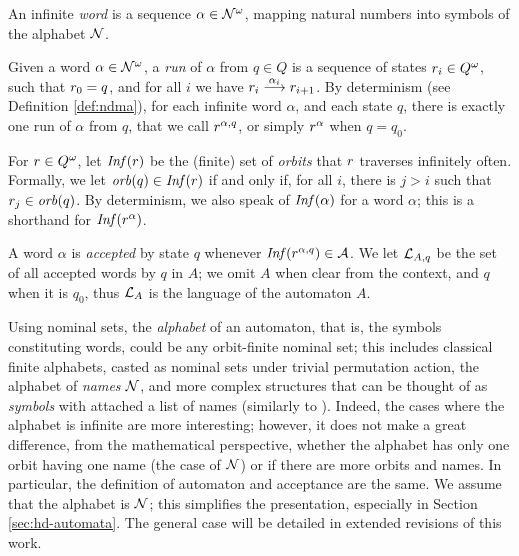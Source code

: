 \begin{definition}
 An infinite \emph{word} is a sequence $\alpha \in \mathcal{N}^\omega$, mapping natural numbers into symbols of the alphabet $\mathcal{N}$.
\end{definition}

\begin{definition}\label{def:nominal-run}
 Given a word $\alpha \in \mathcal{N}^\omega$, a \emph{run} of $\alpha$ from $q \in Q$ is a sequence of states $r_i \in Q^\omega$, such that $r_0 = q$, and for all $i$ we have $r_i \overset{\alpha_i}{\longrightarrow} r_{i+1}$. 
 By determinism (see Definition \ref{def:ndma}), for each infinite word $\alpha$, and each state $q$, there is exactly one run of $\alpha$ from $q$, that we call $r^{\alpha,q}$, or simply $r^{\alpha}$ when $q=q_0$.
\end{definition}

\begin{definition}\label{def:inf-set}
 For $r \in Q^\omega$, let $\mathit{Inf}(r)$ be the (finite) set of \emph{orbits} that $r$ traverses infinitely often. Formally, we let $\mathit{orb}(q) \in \mathit{Inf}(r)$ if and only if, for all $i$, there is $j > i$ such that $r_j \in \mathit{orb}(q)$. By determinism, we also speak of $\mathit{Inf}(\alpha)$ for a word $\alpha$; this is a shorthand for $\mathit{Inf}(r^\alpha)$.
\end{definition}

\begin{definition}
 A word $\alpha$ is \emph{accepted} by state $q$ whenever $\mathit{Inf}(r^{\alpha,q}) \in \mathcal{A}$. We let $\mathcal{L}_{A,q}$ be the set of all accepted words by $q$ in $A$; we omit $A$ when clear from the context, and $q$ when it is $q_0$, thus $\mathcal{L}_A$ is the language of the automaton $A$.
\end{definition}

\begin{remark}\label{rem:simple-alphabet} Using nominal sets, the \emph{alphabet} of an automaton, that is, the symbols constituting words, could be any orbit-finite nominal set; this includes classical finite alphabets, casted as nominal sets under trivial permutation action, the alphabet of \emph{names} $\mathcal{N}$, and more complex structures that can be thought of as \emph{symbols} with attached a list of names (similarly to \cite{MikBartekLICS}). Indeed, the cases where the alphabet is infinite are more interesting; however, it does not make a great difference, from the mathematical perspective, whether the alphabet has only one orbit having one name (the case of $\mathcal{N}$) or if there are more orbits and names. In particular, the definition of automaton and acceptance are the same. We assume that the alphabet is $\mathcal{N}$; this simplifies the presentation, especially in Section \ref{sec:hd-automata}. The general case will be detailed in extended revisions of this work.
\end{remark}

